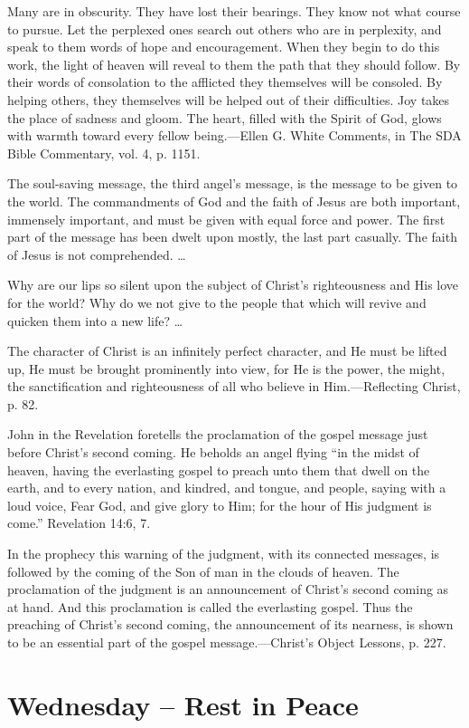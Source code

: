 \documentclass[a4paper, 10pt, twoside, headings=small]{scrartcl}
\begin{document}
\begin{multicols}{2}
Many are in obscurity. They have lost their bearings. They know not what course to pursue. Let the perplexed ones search out others who are in perplexity, and speak to them words of hope and encouragement. When they begin to do this work, the light of heaven will reveal to them the path that they should follow. By their words of consolation to the afflicted they themselves will be consoled. By helping others, they themselves will be helped out of their difficulties. Joy takes the place of sadness and gloom. The heart, filled with the Spirit of God, glows with warmth toward every fellow being.—Ellen G. White Comments, in The SDA Bible Commentary, vol. 4, p. 1151.

The soul-saving message, the third angel’s message, is the message to be given to the world. The commandments of God and the faith of Jesus are both important, immensely important, and must be given with equal force and power. The first part of the message has been dwelt upon mostly, the last part casually. The faith of Jesus is not comprehended. …

Why are our lips so silent upon the subject of Christ’s righteousness and His love for the world? Why do we not give to the people that which will revive and quicken them into a new life? …

The character of Christ is an infinitely perfect character, and He must be lifted up, He must be brought prominently into view, for He is the power, the might, the sanctification and righteousness of all who believe in Him.—Reflecting Christ, p. 82.

John in the Revelation foretells the proclamation of the gospel message just before Christ’s second coming. He beholds an angel flying “in the midst of heaven, having the everlasting gospel to preach unto them that dwell on the earth, and to every nation, and kindred, and tongue, and people, saying with a loud voice, Fear God, and give glory to Him; for the hour of His judgment is come.” Revelation 14:6, 7.

In the prophecy this warning of the judgment, with its connected messages, is followed by the coming of the Son of man in the clouds of heaven. The proclamation of the judgment is an announcement of Christ’s second coming as at hand. And this proclamation is called the everlasting gospel. Thus the preaching of Christ’s second coming, the announcement of its nearness, is shown to be an essential part of the gospel message.—Christ’s Object Lessons, p. 227.

\section*{Wednesday – Rest in Peace}


\end{multicols}
\end{document}

